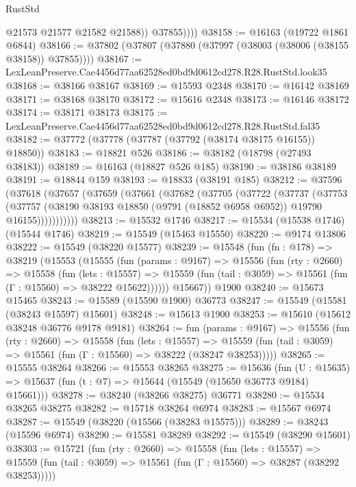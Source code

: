 \begin{lexlean}{RustStd}
\begin{coremodule}
                @21573
                @21577
                @21582
                @21588))
            @37855))))
@38158 := @16163 (@19722 @1861 @6844)
@38166 := @37802 (@37807 (@37880 (@37997 (@38003 (@38006 (@38155 @38158)) @37855))))
@38167 := LexLeanPreserve.Cae4456d77aa62528ed0bd9d0612cd278.R28.RustStd.look35
@38168 := @38166 @38167
@38169 := @15593 @2348
@38170 := @16142 @38169
@38171 := @38168 @38170
@38172 := @15616 @2348
@38173 := @16146 @38172
@38174 := @38171 @38173
@38175 := LexLeanPreserve.Cae4456d77aa62528ed0bd9d0612cd278.R28.RustStd.fal35
@38182 := @37772 (@37778 (@37787 (@37792 (@38174 @38175 @16155)) @18850))
@38183 := @18821 @526
@38186 := @38182 (@18798 (@27493 @38183))
@38189 := @16163 (@18827 @526 @185)
@38190 := @38186 @38189
@38191 := @18844 @159
@38193 := @18833 (@38191 @185)
@38212 := @37596
    (@37618
      (@37657
        (@37659
          (@37661
            (@37682
              (@37705
                (@37722
                  (@37737
                    (@37753
                      (@37757
                        (@38190 @38193 @18850 (@9791 (@18852 @6958 @6952)) @19790 @16155)))))))))))
@38213 := @15532 @1746
@38217 := @15534 (@15538 @1746) (@15544 @1746)
@38219 := @15549 (@15463 @15550)
@38220 := @9174 @13806
@38222 := @15549 (@38220 @15577)
@38239 := @15548
    (fun (fn : @178) =>
    @38219
      (@15553
        (@15555
          (fun (params : @9167) =>
          @15556
            (fun (rty : @2660) =>
            @15558
              (fun (lets : @15557) =>
              @15559 (fun (tail : @3059) => @15561 (fun (Γ : @15560) => @38222 @15622))))))
        @15667))
    @1900
@38240 := @15673 @15465
@38243 := @15589 (@15590 @1900) @36773
@38247 := @15549 (@15581 (@38243 @15597) @15601)
@38248 := @15613 @1900
@38253 := @15610 (@15612 @38248 @36776 @9178 @9181)
@38264 := fun (params : @9167) =>
  @15556
    (fun (rty : @2660) =>
    @15558
      (fun (lets : @15557) =>
      @15559 (fun (tail : @3059) => @15561 (fun (Γ : @15560) => @38222 (@38247 @38253)))))
@38265 := @15555 @38264
@38266 := @15553 @38265
@38275 := @15636
    (fun (U : @15635) => @15637 (fun (t : @7) => @15644 (@15549 (@15650 @36773 @9184) @15661)))
@38278 := @38240 (@38266 @38275) @36771
@38280 := @15534 @38265 @38275
@38282 := @15718 @38264 @6974
@38283 := @15567 @6974
@38287 := @15549 (@38220 (@15566 (@38283 @15575)))
@38289 := @38243 (@15596 @6974)
@38290 := @15581 @38289
@38292 := @15549 (@38290 @15601)
@38303 := @15721
    (fun (rty : @2660) =>
    @15558
      (fun (lets : @15557) =>
      @15559 (fun (tail : @3059) => @15561 (fun (Γ : @15560) => @38287 (@38292 @38253)))))

\end{coremodule}
\end{lexlean}
